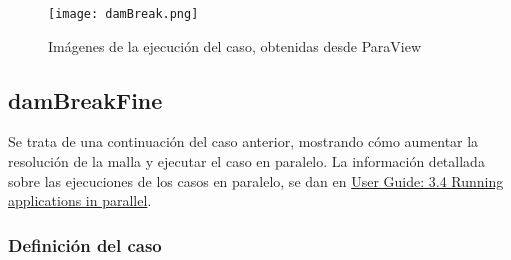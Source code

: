 \begin{figure}
\centering
\texttt{[image: damBreak.png]}
\caption[Animación del caso]{Imágenes de la ejecución del caso, obtenidas desde ParaView}
\label{fig:damBreak}
\end{figure}

\subsection{damBreakFine}\label{header-n674}

Se trata de una continuación del caso anterior, mostrando cómo aumentar
la resolución de la malla y ejecutar el caso en paralelo. La información
detallada sobre las ejecuciones de los casos en paralelo, se dan en
\href{http://cfd.direct/openfoam/user-guide/running-applications-parallel}{User
Guide: 3.4 Running applications in parallel}.

\subsubsection{Definición del caso}\label{header-n679}

